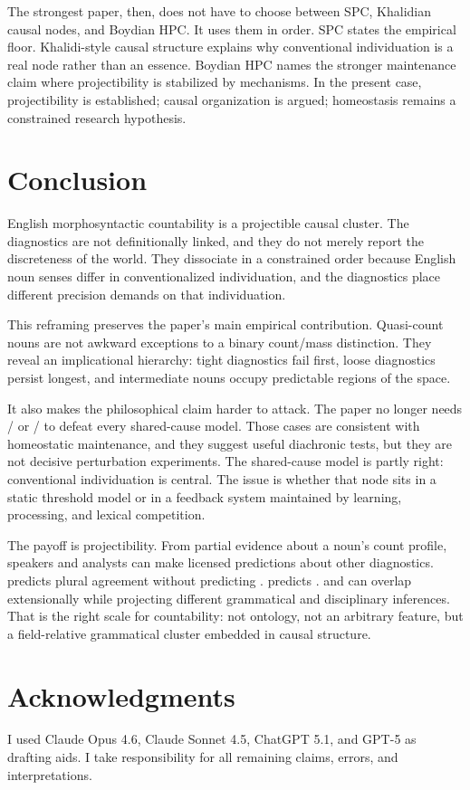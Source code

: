 \documentclass[12pt,a4paper]{article}
\begin{document}
The strongest paper, then, does not have to choose between SPC, Khalidian causal nodes, and Boydian HPC. It uses them in order. SPC states the empirical floor. Khalidi-style causal structure explains why conventional individuation is a real node rather than an essence. Boydian HPC names the stronger maintenance claim where projectibility is stabilized by mechanisms. In the present case, projectibility is established; causal organization is argued; homeostasis remains a constrained research hypothesis.

\section{Conclusion}\label{sec:conclusion-v3}

English morphosyntactic countability is a projectible causal cluster. The diagnostics are not definitionally linked, and they do not merely report the discreteness of the world. They dissociate in a constrained order because English noun senses differ in conventionalized individuation, and the diagnostics place different precision demands on that individuation.

This reframing preserves the paper's main empirical contribution. Quasi-count nouns are not awkward exceptions to a binary count/mass distinction. They reveal an implicational hierarchy: tight diagnostics fail first, loose diagnostics persist longest, and intermediate nouns occupy predictable regions of the space.

It also makes the philosophical claim harder to attack. The paper no longer needs / or / to defeat every shared-cause model. Those cases are consistent with homeostatic maintenance, and they suggest useful diachronic tests, but they are not decisive perturbation experiments. The shared-cause model is partly right: conventional individuation is central. The issue is whether that node sits in a static threshold model or in a feedback system maintained by learning, processing, and lexical competition.

The payoff is projectibility. From partial evidence about a noun's count profile, speakers and analysts can make licensed predictions about other diagnostics.  predicts plural agreement without predicting .  predicts .  and  can overlap extensionally while projecting different grammatical and disciplinary inferences. That is the right scale for countability: not ontology, not an arbitrary feature, but a field-relative grammatical cluster embedded in causal structure.

\section*{Acknowledgments}

I used Claude Opus 4.6, Claude Sonnet 4.5, ChatGPT 5.1, and GPT-5 as drafting aids. I take responsibility for all remaining claims, errors, and interpretations.

\newpage

\printbibliography
\end{document}
